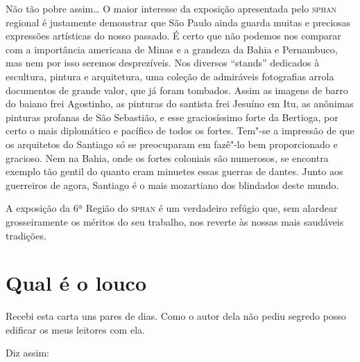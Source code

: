 Não tão pobre assim\ldots{} O maior interesse da exposição apresentada pelo
\textsc{sphan} regional é justamente demonstrar que São Paulo ainda guarda muitas
e preciosas expressões artísticas do nosso passado. É certo que não
podemos nos comparar com a importância americana de Minas e a grandeza
da Bahia e Pernambuco, mas nem por isso seremos desprezíveis. Nos
diversos ``stands'' dedicados à escultura, pintura e arquitetura, uma
coleção de admiráveis fotografias arrola documentos de grande valor, que
já foram tombados. Assim as imagens de barro do baiano frei Agostinho,
as pinturas do santista frei Jesuíno em Itu, as anônimas pinturas
profanas de São Sebastião, e esse graciosíssimo forte da Bertioga, por
certo o mais diplomático e pacífico de todos os fortes. Tem"-se a
impressão de que os arquitetos do Santiago só se preocuparam em fazê"-lo
bem proporcionado e gracioso. Nem na Bahia, onde os fortes coloniais são
numerosos, se encontra exemplo tão gentil do quanto eram minuetes essas
guerras de dantes. Junto aos guerreiros de agora, Santiago é o mais
mozartiano dos blindados deste mundo.

A exposição da 6ª Região do \textsc{sphan} é um verdadeiro refúgio que, sem
alardear grosseiramente os méritos do seu trabalho, nos reverte às
nossas mais saudáveis tradições.

\chapter{Qual é o louco}

Recebi esta carta uns pares de dias. Como o autor dela não pediu segredo
posso edificar os meus leitores com ela.

Diz assim:

